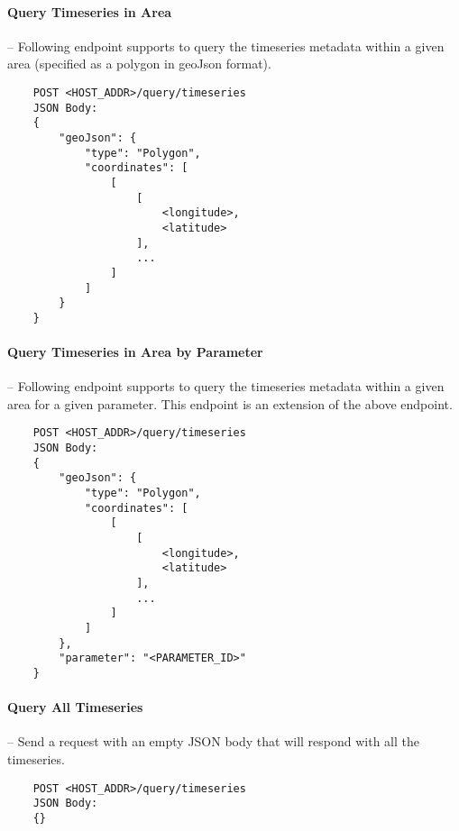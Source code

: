 \paragraph{Query Timeseries in Area} -- Following endpoint supports to query the timeseries metadata within a given area (specified as a polygon in geoJson format).
\begin{lstlisting}
    POST <HOST_ADDR>/query/timeseries
    JSON Body:
    {
        "geoJson": {
            "type": "Polygon",
            "coordinates": [
                [
                    [
                        <longitude>,
                        <latitude>
                    ],
                    ...
                ]
            ]
        }
    }
\end{lstlisting}

\paragraph{Query Timeseries in Area by Parameter}-- Following endpoint supports to query the timeseries metadata within a given area for a given parameter. This endpoint is an extension of the above endpoint.
\begin{lstlisting}
    POST <HOST_ADDR>/query/timeseries
    JSON Body:
    {
        "geoJson": {
            "type": "Polygon",
            "coordinates": [
                [
                    [
                        <longitude>,
                        <latitude>
                    ],
                    ...
                ]
            ]
        },
        "parameter": "<PARAMETER_ID>"
    }
\end{lstlisting}

\paragraph{Query All Timeseries} -- Send a request with an empty JSON body that will respond with all the timeseries.
\begin{lstlisting}
    POST <HOST_ADDR>/query/timeseries
    JSON Body:
    {}
\end{lstlisting}
